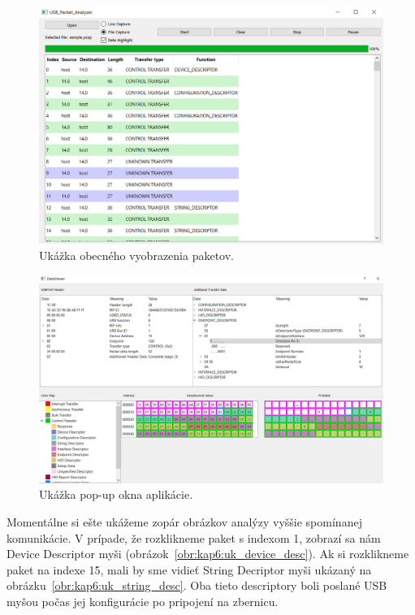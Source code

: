 \begin{figure}[!htb]
	\centering
	\includegraphics[width=\textwidth]{img/kap06_uk_general}
	\caption{Ukážka obecného vyobrazenia paketov.}
	\label{obr:kap6:uk_general}
\end{figure}

\begin{figure}[!htb]
	\centering
	\includegraphics[width=\textwidth]{img/kap06_uk_popup}
	\caption{Ukážka pop-up okna aplikácie.}
	\label{obr:kap6:uk_popup}
\end{figure}

\clearpage

Momentálne si ešte ukážeme zopár obrázkov analýzy vyššie spomínanej komunikácie. V prípade, že rozklikneme paket s indexom 1, zobrazí sa nám Device Descriptor myši (obrázok~\ref{obr:kap6:uk_device_desc}). Ak si rozklikneme paket na indexe 15, mali by sme vidieť String Decriptor myši ukázaný na obrázku~\ref{obr:kap6:uk_string_desc}. Oba tieto descriptory boli poslané USB myšou počas jej konfigurácie po pripojení na zbernicu.

